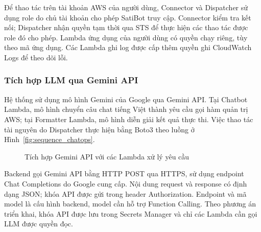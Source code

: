\documentclass[a4paper,12pt]{article}
\begin{document}
Để thao tác trên tài khoản AWS của người dùng, Connector và Dispatcher sử dụng role do chủ tài khoản cho phép SatiBot truy cập. Connector kiểm tra kết nối; Dispatcher nhận quyền tạm thời qua STS để thực hiện các thao tác được role đó cho phép. Lambda ứng dụng của người dùng có quyền chạy riêng, tùy theo mã ứng dụng. Các Lambda ghi log được cấp thêm quyền ghi CloudWatch Logs để theo dõi lỗi.

\subsubsection{Tích hợp LLM qua Gemini API}
\label{sec:llm_integration}

Hệ thống sử dụng mô hình Gemini của Google qua Gemini API. Tại Chatbot Lambda, mô hình chuyển câu chat tiếng Việt thành yêu cầu gọi hàm quản trị AWS; tại Formatter Lambda, mô hình diễn giải kết quả thực thi. Việc thao tác tài nguyên do Dispatcher thực hiện bằng Boto3 theo luồng ở Hình~\ref{fig:sequence_chatops}.


\begin{figure}[H]
\centering
{}
\caption{Tích hợp Gemini API với các Lambda xử lý yêu cầu}
\label{fig:llm_integration}
\end{figure}

Backend gọi Gemini API bằng HTTP POST qua HTTPS, sử dụng endpoint Chat Completions do Google cung cấp. Nội dung request và response có định dạng JSON; khóa API được gửi trong header Authorization. Endpoint và mã model là cấu hình backend, model cần hỗ trợ Function Calling. Theo phương án triển khai, khóa API được lưu trong Secrets Manager và chỉ các Lambda cần gọi LLM được quyền đọc.
\end{document}
